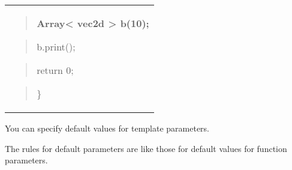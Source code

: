 \documentclass[
]{article}
\begin{document}
\begin{longtable}[]{@{}
  >{\raggedright\arraybackslash}p{}@{}}
\begin{quote}
\textbf{ Array\textless{} vec2d \textgreater{} b(10); }
\end{quote}

\begin{quote}
b.print();
\end{quote}

\begin{quote}
return 0;
\end{quote}

\begin{quote}
\}
\end{quote} \\
\end{longtable}

You can specify default values for template parameters.

The rules for default parameters are like those for default values for
function parameters.
\end{document}

